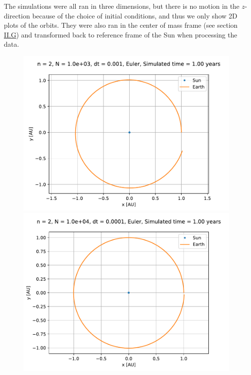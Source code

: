 \documentclass[reprint,english,notitlepage]{revtex4-1}  %
\begin{document}
The simulations were all ran in three dimensions, but there is no motion in the $z$-direction because of the choice of initial conditions, and thus we only show 2D plots of the orbits. They were also ran in the center of mass frame (see section \hyperref[sec:II:g]{II.G}) and transformed back to reference frame of the Sun when processing the data.

\begin{figure}[H]
\includegraphics[width=\columnwidth]{../data/figures/sun-earth-3c/se_dt1e-3_fe_orbit2D.pdf}
\includegraphics[width=\columnwidth]{../data/figures/sun-earth-3c/se_dt1e-4_fe_orbit2D.pdf}

\end{figure}
\end{document}
